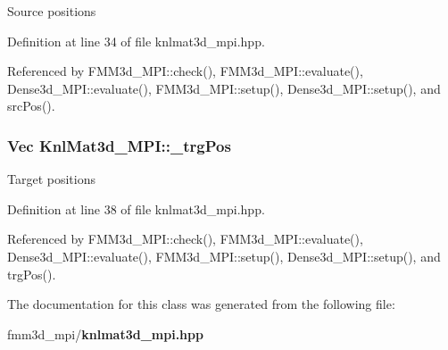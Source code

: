 Source positions 

Definition at line 34 of file knlmat3d\_\-mpi.hpp.

Referenced by FMM3d\_\-MPI::check(), FMM3d\_\-MPI::evaluate(), Dense3d\_\-MPI::evaluate(), FMM3d\_\-MPI::setup(), Dense3d\_\-MPI::setup(), and src\-Pos().
\subsubsection{\setlength{\rightskip}{0pt plus 5cm}Vec {\bf Knl\-Mat3d\_\-MPI::\_\-trg\-Pos}\hspace{0.3cm}{\tt  [protected]}}\label{classKnlMat3d__MPI_a1b44c7c6fd0a38be167c34537b1a508_a1b44c7c6fd0a38be167c34537b1a508}


Target positions 

Definition at line 38 of file knlmat3d\_\-mpi.hpp.

Referenced by FMM3d\_\-MPI::check(), FMM3d\_\-MPI::evaluate(), Dense3d\_\-MPI::evaluate(), FMM3d\_\-MPI::setup(), Dense3d\_\-MPI::setup(), and trg\-Pos().

The documentation for this class was generated from the following file:\begin{CompactItemize}
\item 
fmm3d\_\-mpi/{\bf knlmat3d\_\-mpi.hpp}\end{CompactItemize}
